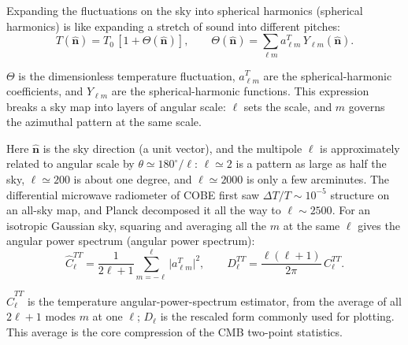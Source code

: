 Expanding the fluctuations on the sky into spherical harmonics (spherical harmonics) is like expanding a stretch of sound into different pitches:
\begin{equation}
  T(\hat{\bm n})=T_0\,[1+\Theta(\hat{\bm n})],
  \qquad
  \Theta(\hat{\bm n})=\sum_{\ell m}a^{T}_{\ell m}\,Y_{\ell m}(\hat{\bm n}).
  \label{eq:e23-temperature-expansion}
\end{equation}
\begin{formulaexplain}
\(\Theta\) is the dimensionless temperature fluctuation, \(a^{T}_{\ell m}\) are the spherical-harmonic coefficients, and \(Y_{\ell m}\) are the spherical-harmonic functions. This expression breaks a sky map into layers of angular scale: \(\ell\) sets the scale, and \(m\) governs the azimuthal pattern at the same scale.
\end{formulaexplain}
Here \(\hat{\bm n}\) is the sky direction (a unit vector), and the multipole \(\ell\) is approximately related to angular scale by \(\theta\simeq180^\circ/\ell\): \(\ell\simeq2\) is a pattern as large as half the sky, \(\ell\simeq200\) is about one degree, and \(\ell\simeq2000\) is only a few arcminutes. The differential microwave radiometer of COBE first saw \(\Delta T/T\sim10^{-5}\) structure on an all-sky map, and Planck decomposed it all the way to \(\ell\sim2500\). For an isotropic Gaussian sky, squaring and averaging all the \(m\) at the same \(\ell\) gives the angular power spectrum (angular power spectrum):
\begin{equation}
  \widehat C^{TT}_\ell=\frac{1}{2\ell+1}\sum_{m=-\ell}^{\ell}\bigl|a^{T}_{\ell m}\bigr|^2,
  \qquad
  D^{TT}_\ell=\frac{\ell(\ell+1)}{2\pi}\,C^{TT}_\ell .
  \label{eq:e23-cl-estimator}
\end{equation}
\begin{formulaexplain}
\(\widehat C^{TT}_\ell\) is the temperature angular-power-spectrum estimator, from the average of all \(2\ell+1\) modes \(m\) at one \(\ell\); \(D_\ell\) is the rescaled form commonly used for plotting. This average is the core compression of the CMB two-point statistics.
\end{formulaexplain}
